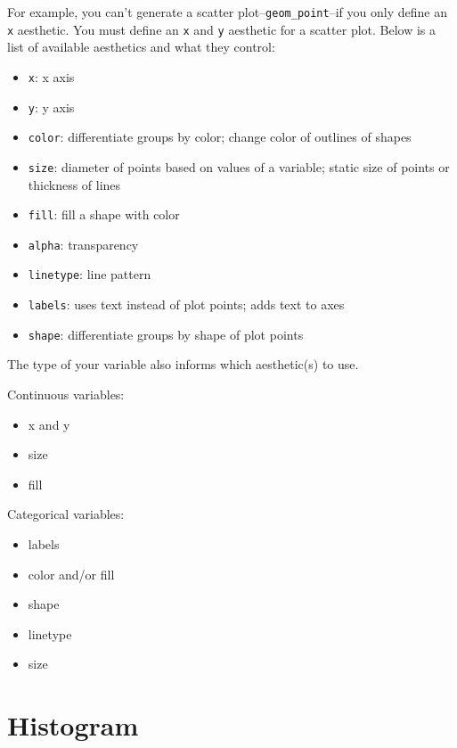 \documentclass[
]{book}
\providecommand{\tightlist}{%
  \setlength{\itemsep}{0pt}\setlength{\parskip}{0pt}}
\begin{document}
For example, you can't generate a scatter plot--\texttt{geom\_point}--if you only define an \texttt{x} aesthetic. You must define an \texttt{x} and \texttt{y} aesthetic for a scatter plot. Below is a list of available aesthetics and what they control:

\begin{itemize}
\tightlist
\item
  \texttt{x}: x axis
\item
  \texttt{y}: y axis
\item
  \texttt{color}: differentiate groups by color; change color of outlines of shapes
\item
  \texttt{size}: diameter of points based on values of a variable; static size of points or thickness of lines
\item
  \texttt{fill}: fill a shape with color
\item
  \texttt{alpha}: transparency
\item
  \texttt{linetype}: line pattern
\item
  \texttt{labels}: uses text instead of plot points; adds text to axes
\item
  \texttt{shape}: differentiate groups by shape of plot points
\end{itemize}

The type of your variable also informs which aesthetic(s) to use.

Continuous variables:

\begin{itemize}
\tightlist
\item
  x and y
\item
  size
\item
  fill
\end{itemize}

Categorical variables:

\begin{itemize}
\tightlist
\item
  labels
\item
  color and/or fill
\item
  shape
\item
  linetype
\item
  size
\end{itemize}

\hypertarget{histogram}{%
\section{Histogram}\label{histogram}}
\end{document}
